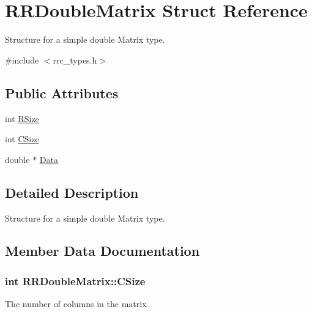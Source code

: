 \hypertarget{struct_r_r_double_matrix}{}\section{R\+R\+Double\+Matrix Struct Reference}
\label{struct_r_r_double_matrix}


Structure for a simple double Matrix type.  




{\ttfamily \#include $<$rrc\+\_\+types.\+h$>$}

\subsection*{Public Attributes}
\begin{DoxyCompactItemize}
\item 
int \hyperlink{struct_r_r_double_matrix_a674431f97c6ce4a6ef05248a67ea1c54}{R\+Size}
\item 
int \hyperlink{struct_r_r_double_matrix_a0df8ed25504d41748cdde8c3e92062bb}{C\+Size}
\item 
double $\ast$ \hyperlink{struct_r_r_double_matrix_afeaa302597fc935e45634c8bd9e1e4b1}{Data}
\end{DoxyCompactItemize}


\subsection{Detailed Description}
Structure for a simple double Matrix type. 

\subsection{Member Data Documentation}
\hypertarget{struct_r_r_double_matrix_a0df8ed25504d41748cdde8c3e92062bb}{}
\subsubsection[{C\+Size}]{\setlength{\rightskip}{0pt plus 5cm}int R\+R\+Double\+Matrix\+::\+C\+Size}\label{struct_r_r_double_matrix_a0df8ed25504d41748cdde8c3e92062bb}
The number of columns in the matrix \hypertarget{struct_r_r_double_matrix_afeaa302597fc935e45634c8bd9e1e4b1}{}
